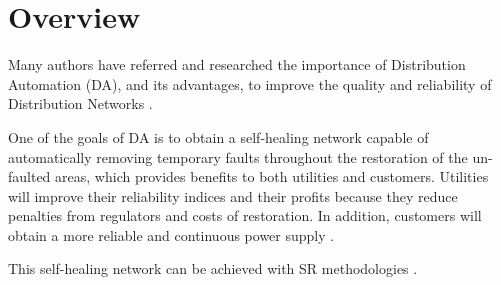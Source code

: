 \section{Overview}
\label{ch-literature:sec:overview}

Many authors have referred and researched the importance of Distribution Automation (DA), and its 
advantages, to improve the quality and reliability of Distribution Networks \cite{Zidan2017} 
\cite{Yao2018} \cite{Abu-Elanien2018} \cite{Madani2015}. 

One of the goals of DA is to obtain a self-healing network capable of 
automatically removing temporary faults throughout the restoration of the un-faulted areas, 
which provides benefits to both utilities and customers. Utilities will improve their reliability 
indices and their profits because they reduce penalties from regulators and costs of restoration. 
In addition, customers will obtain a more reliable and continuous power supply \cite{Angelo2013}. 

This self-healing network can be achieved with SR methodologies 
\cite{USDepartmentofEnergy2016} \cite{Yokoyama2012} \cite{Koch-Ciobotaru2014} \cite{Zidan2012}.
